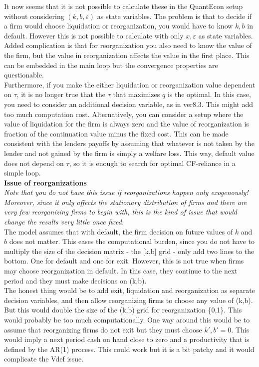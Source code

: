 \documentclass[12pt]{article}
\begin{document}
It now seems that it is not possible to calculate these in the QuantEcon setup without considering $(k,b,\varepsilon)$ as state variables. The problem is that to decide if a firm would choose liquidation or reorganization, you would have to know $k,b$ in default. However this is not possible to calculate with only $x,\varepsilon$ as state variables. Added complication is that for reorganization you also need to know the value of the firm, but the value in reorganization affects the value in the first place. This can be embedded in the main loop but the convergence properties are questionable. \vspace{3mm} \\ 
Furthermore, if you make the either liquidation or reorganization value dependent on $\tau$, it is no longer true that the $\tau$ that maximizes $q$ is the optimal. In this case, you need to consider an additional decision variable, as in ver8.3. This might add too much computation cost. Alternatively, you can consider a setup where the value of liquidation for the firm is always zero and the value of reorganization is fraction of the continuation value minus the fixed cost. This can be made consistent with the lenders payoffs by assuming that whatever is not taken by the lender and not gained by the firm is simply a welfare loss. This way, default value does not depend on $\tau$, so it is enough to search for optimal CF-reliance in a simple loop.  \vspace{3mm} \\
\textbf{Issue of reorganizations} \\
\textit{Note that you do not have this issue if reorganizations happen only exogenously! Moreover, since it only affects the stationary distribution of firms and there are very few reorganizing firms to begin with, this is the kind of issue that would change the results very little once fixed.} \vspace{3mm} \\ The model assumes that with default, the firm decision on future values of $k$ and $b$ does not matter. This eases the computational burden, since you do not have to multiply the size of the decision matrix - the [k,b] grid - only add two lines to the bottom. One for default and one for exit. However, this is not true when firms may choose reorganization in default. In this case, they continue to the next period and they must make decisions on (k,b). \vspace{3mm} \\
The honest thing would be to add exit, liquidation and reorganization as separate decision variables, and then allow reorganizing firms to choose any value of (k,b). But this would double the size of the (k,b) grid for reorganization \{0,1\}. This would probably be too much computationally. One way around this would be to assume that reorganizing firms do not exit but they must choose $k',b' = 0$. This would imply a next period cash on hand close to zero and a productivity that is defined by the AR(1) process. This could work but it is a bit patchy and it would complicate the Vdef issue. \vspace{3mm} \\ 
\end{document}
